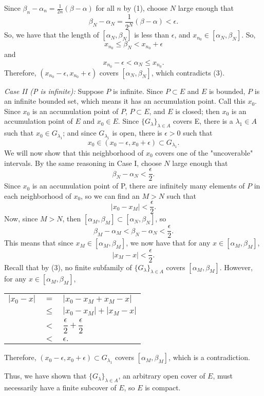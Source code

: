 \documentclass[11pt]{article}
\makeatletter
\renewenvironment{proof}{{\bfseries Proof}}{\qed}
\renewenvironment{proof}[1][\bfseries \proofname]{\par
  \pushQED{\qed}%
  \normalfont \topsep6\p@\@plus6\p@\relax
  \trivlist
  \item[\hskip\labelsep
        \scshape
    #1\@addpunct{}]\ignorespaces
}{%
  \popQED\endtrivlist\@endpefalse
}
\newcommand{\glambda}{\{G_\lambda\}_{\lambda \in A}}
\makeatother
\begin{document}
\begin{proof}
\noindent Since $\beta_n - \alpha_n = \frac{1}{2n}(\beta - \alpha)$ for all $n$ by (1), choose $N$ large enough that 
$$\beta_N - \alpha_N = \frac{1}{2^N}(\beta - \alpha) < \epsilon.$$
So, we have that the length of $[\alpha_N, \beta_N]$ is less than $\epsilon$, and $x_{n_0} \in [\alpha_N, \beta_N]$.
So, $$x_{n_0} \leq \beta_N < x_{n_0} + \epsilon $$
and $$x_{n_0} - \epsilon < \alpha_N \leq x_{n_0}.$$
Therefore, $(x_{n_0} - \epsilon, x_{n_0} + \epsilon)$ covers $[\alpha_N, \beta_N]$, which contradicts (3).

\textit{Case II (P is infinite):} Suppose $P$ is infinite. Since $P \subset E$ and $E$ is bounded, $P$ is an infinite bounded set, which means it has an accumulation point. Call this $x_0$. Since $x_0$ is an accumulation point of $P$, $P \subset E$, and $E$ is closed; then $x_0$ is an accumulation point of $E$ and $x_0 \in E$. Since $\glambda$ covers E, there is a $\lambda_1 \in A$ such that $x_0 \in G_{\lambda_1}$; and since $G_{\lambda_1}$ is open, there is $\epsilon > 0$ such that 
$$x_0 \in (x_0 - \epsilon, x_0 + \epsilon) \subset G_{\lambda_1}.$$
We will now show that this neighborhood of $x_0$ covers one of the "uncoverable" intervals. By the same reasoning in Case I, choose $N$ large enough that 
$$\beta_N - \alpha_N < \frac{\epsilon}{2}.$$
Since $x_0$ is an accumulation point of P, there are infinitely many elements of $P$ in each neighborhood of $x_0$, so we can find an $M > N$ such that 
$$|x_0 - x_M| < \frac{\epsilon}{2}.$$
Now, since $M>N$, then $[\alpha_M, \beta_M] \subset [\alpha_N, \beta_N]$, so  
$$\beta_M - \alpha_M < \beta_N - \alpha_N < \frac{\epsilon}{2}.$$
This means that since $x_M \in [\alpha_M, \beta_M]$, we now have that for any $x \in [\alpha_M, \beta_M]$, 
$$ |x_M - x|< \frac{\epsilon}{2}.$$
Recall that by (3), no finite subfamily of $\glambda$ covers $[\alpha_M, \beta_M]$. However, for any $x \in [\alpha_M, \beta_M]$,

\begin{center}
\begin{tabular}{rcl}
$|x_0 - x|$ 	& $=$	& $|x_0 - x_M + x_M - x|$ \\
				& $\leq$	& $|x_0 - x_M| + |x_M - x|$  \\
				& $<$	& $\dfrac{\epsilon}{2} + \dfrac{\epsilon}{2}$  \\
				& $<$	& $\epsilon.$  \\
\end{tabular}
\end{center}
Therefore, $(x_0 - \epsilon, x_0 + \epsilon) \subset G_{\lambda_1}$ covers $[\alpha_M, \beta_M]$, which is a contradiction.

Thus, we have shown that $\glambda$, an arbitrary open cover of $E$, must necessarily have a finite subcover of $E$, so $E$ is compact.  
\end{proof}
\end{document}

